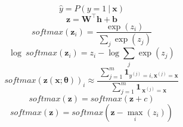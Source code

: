 %
%
%
%
%
%


  \begin{equation} \tag{6.27}
    \label{eq_6_27}
    \hat{y} = P( y=1\ |\ \bm{x} )
  \end{equation}
  \begin{equation} \tag{6.28}
    \label{eq_6_28}
    \bm{z} = \bm{W} ^ \top \bm{h} + \bm{b}
  \end{equation}
  \begin{equation} \tag{6.29}
    \label{eq_6_29}
    softmax( \bm{z} _ i ) = \frac{\ \exp(z_i) } {\ \sum _ j \exp(z_j) }
  \end{equation}
  \begin{equation} \tag{6.30}
    \label{eq_6_30}
    \log\ softmax( \bm{z} _ i ) = z_i - \log \sum _ j \exp(z_j)
  \end{equation}
  \begin{equation} \tag{6.31}
    \label{eq_6_31}
    {softmax( \bm{z}( \bm{x};\bm{\theta} ) )} _ i \approx
      \frac{\ \sum ^ m _ {j=1} \bm{1} _ {y ^ {(j)} = i, \bm{x} ^ {(j)} = \bm{x}} }
        {\ \sum ^ m _ {j=1} \bm{1} _ {\ \bm{x} ^ {(j)} = \bm{x}} }
  \end{equation}
  \begin{equation} \tag{6.32}
    \label{eq_6_32}
    softmax( \bm{z} ) = softmax( \bm{z} + c )
  \end{equation}
  \begin{equation} \tag{6.33}
    \label{eq_6_33}
    softmax( \bm{z} ) = softmax( \bm{z} - \max _ i (z _ i) )
  \end{equation}


